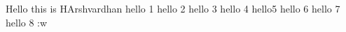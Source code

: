 Hello this is HArshvardhan
hello 1
hello 2
hello 3
 hello 4
 hello5 
 hello 6
  hello 7
  hello 8
:w
